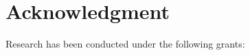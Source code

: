 
\section*{Acknowledgment}
Research has been conducted under the following grants:\\


\nocite{*}



\begin{thebibliography}{1}


\end{thebibliography}



